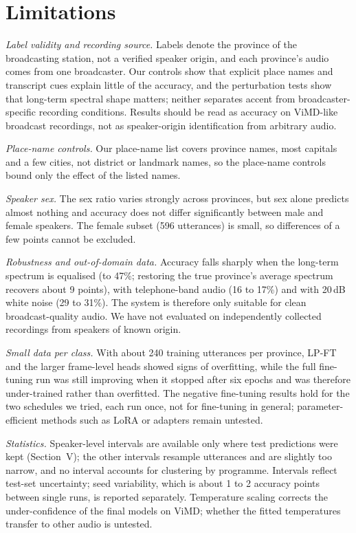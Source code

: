 \documentclass[conference]{IEEEtran}
\begin{document}
\section{Limitations}
\textit{Label validity and recording source.} Labels denote the province of the broadcasting station, not a verified speaker origin, and each province's audio comes from one broadcaster. Our controls show that explicit place names and transcript cues explain little of the accuracy, and the perturbation tests show that long-term spectral shape matters; neither separates accent from broadcaster-specific recording conditions. Results should be read as accuracy on ViMD-like broadcast recordings, not as speaker-origin identification from arbitrary audio.

\textit{Place-name controls.} Our place-name list covers province names, most capitals and a few cities, not district or landmark names, so the place-name controls bound only the effect of the listed names.

\textit{Speaker sex.} The sex ratio varies strongly across provinces, but sex alone predicts almost nothing and accuracy does not differ significantly between male and female speakers. The female subset (596 utterances) is small, so differences of a few points cannot be excluded.

\textit{Robustness and out-of-domain data.} Accuracy falls sharply when the long-term spectrum is equalised (to 47\%; restoring the true province's average spectrum recovers about 9 points), with telephone-band audio (16 to 17\%) and with 20\,dB white noise (29 to 31\%). The system is therefore only suitable for clean broadcast-quality audio. We have not evaluated on independently collected recordings from speakers of known origin.

\textit{Small data per class.} With about 240 training utterances per province, LP-FT and the larger frame-level heads showed signs of overfitting, while the full fine-tuning run was still improving when it stopped after six epochs and was therefore under-trained rather than overfitted. The negative fine-tuning results hold for the two schedules we tried, each run once, not for fine-tuning in general; parameter-efficient methods such as LoRA or adapters remain untested.

\textit{Statistics.} Speaker-level intervals are available only where test predictions were kept (Section~V); the other intervals resample utterances and are slightly too narrow, and no interval accounts for clustering by programme. Intervals reflect test-set uncertainty; seed variability, which is about 1 to 2 accuracy points between single runs, is reported separately. Temperature scaling corrects the under-confidence of the final models on ViMD; whether the fitted temperatures transfer to other audio is untested.
\end{document}
